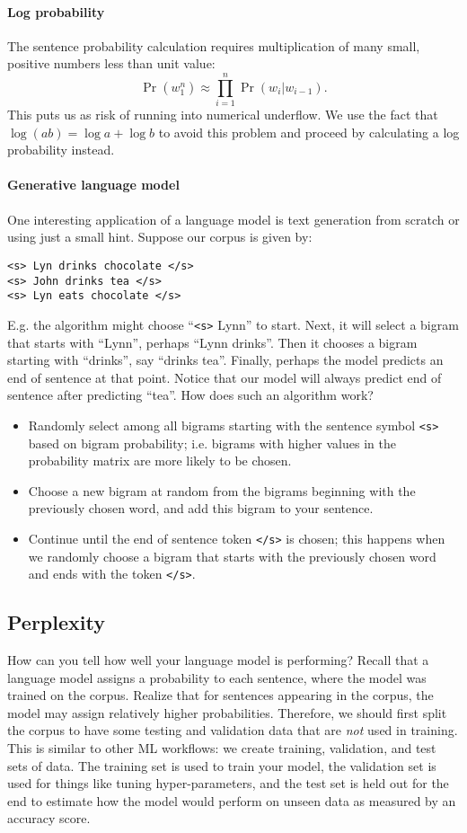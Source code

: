 \documentclass[12pt]{article}
\begin{document}
\paragraph{Log probability} The sentence probability calculation requires multiplication of many small, positive numbers less than unit value:
\[
  \Pr(w_1^n) \approx \prod_{i=1}^{n} \Pr(w_i | w_{i-1}).
\]
This puts us as risk of running into numerical underflow. We use the fact that $\log (ab) = \log a + \log b$ to avoid this problem and proceed by calculating a log probability instead.

\paragraph{Generative language model} One interesting application of a language model is text generation from scratch or using just a small hint. Suppose our corpus is given by:
\begin{verbatim}
<s> Lyn drinks chocolate </s>
<s> John drinks tea </s>
<s> Lyn eats chocolate </s>
\end{verbatim}
E.g. the algorithm might choose ``\texttt{<s>} Lynn'' to start. Next, it will select a bigram that starts with ``Lynn'', perhaps ``Lynn drinks''. Then it chooses a bigram starting with ``drinks'', say ``drinks tea''. Finally, perhaps the model predicts an end of sentence at that point. Notice that our model will always predict end of sentence after predicting ``tea''. How does such an algorithm work?
\begin{itemize}
\item Randomly select among all bigrams starting with the sentence symbol   \texttt{<s>} based on bigram probability; i.e. bigrams with higher values in the probability matrix are more likely to be chosen.
\item Choose a new bigram at random from the bigrams beginning with the   previously chosen word, and add this bigram to your sentence.
\item Continue until the end of sentence token \texttt{</s>} is chosen; this happens when we randomly choose a bigram that starts with the previously chosen word and ends with the token \texttt{</s>}.
\end{itemize}

\subsection{Perplexity} How can you tell how well your language model is performing? Recall that a language model assigns a probability to each sentence, where the model was trained on the corpus. Realize that for sentences appearing in the corpus, the model may assign relatively higher probabilities. Therefore, we should first split the corpus to have some testing and validation data that are \emph{not} used in training. This is similar to other ML workflows: we create training, validation, and test sets of data. The training set is used to train your model, the validation set is used for things like tuning hyper-parameters, and the test set is held out for the end to estimate how the model would perform on unseen data as measured by an accuracy score.
\end{document}
